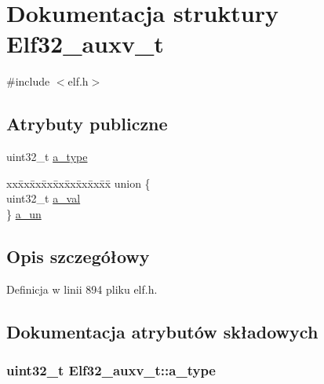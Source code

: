 \hypertarget{struct_elf32__auxv__t}{\section{Dokumentacja struktury Elf32\-\_\-auxv\-\_\-t}
\label{struct_elf32__auxv__t}
}


{\ttfamily \#include $<$elf.\-h$>$}

\subsection*{Atrybuty publiczne}
\begin{DoxyCompactItemize}
\item 
uint32\-\_\-t \hyperlink{struct_elf32__auxv__t_ab6d0fd7066a8703da6fa658d3c0c085d}{a\-\_\-type}
\item 
\begin{tabbing}
xx\=xx\=xx\=xx\=xx\=xx\=xx\=xx\=xx\=\kill
union \{\\
\>uint32\_t \hyperlink{struct_elf32__auxv__t_a527cb12aa61f2b93e67e72b2d9bb6312}{a\_val}\\
\} \hyperlink{struct_elf32__auxv__t_afe17fc70719136f46462ccd117875236}{a\_un}\\

\end{tabbing}\end{DoxyCompactItemize}


\subsection{Opis szczegółowy}


Definicja w linii 894 pliku elf.\-h.



\subsection{Dokumentacja atrybutów składowych}
\hypertarget{struct_elf32__auxv__t_ab6d0fd7066a8703da6fa658d3c0c085d}{
\subsubsection[{a\-\_\-type}]{\setlength{\rightskip}{0pt plus 5cm}uint32\-\_\-t Elf32\-\_\-auxv\-\_\-t\-::a\-\_\-type}}\label{struct_elf32__auxv__t_ab6d0fd7066a8703da6fa658d3c0c085d}


